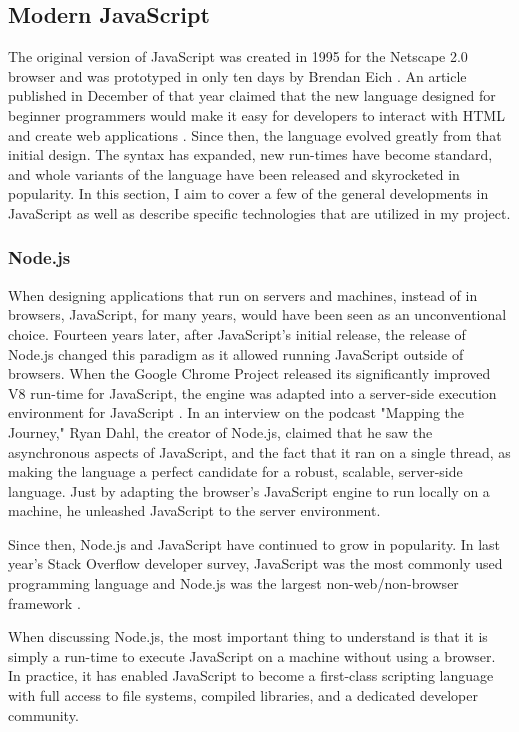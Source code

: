 \subsection{Modern JavaScript}

The original version of JavaScript was created in 1995 for the Netscape 2.0 browser and was prototyped in only ten days by Brendan Eich \cite{redhatinc.CreatingJavaScript}.  An article published in December of that year claimed that the new language designed for beginner programmers would make it easy for developers to interact with HTML and create web applications \cite{bucholtzNewLanguageAims1995}.  Since then, the language evolved greatly from that initial design.  The syntax has expanded, new run-times have become standard, and whole variants of the language have been released and skyrocketed in popularity.  In this section, I aim to cover a few of the general developments in JavaScript as well as describe specific technologies that are utilized in my project.

\subsubsection{Node.js}
When designing applications that run on servers and machines, instead of in browsers, JavaScript, for many years, would have been seen as an unconventional choice.  Fourteen years later, after JavaScript's initial release, the release of Node.js changed this paradigm as it allowed running JavaScript outside of browsers. When the Google Chrome Project released its significantly improved V8 run-time for JavaScript, the engine was adapted into a server-side execution environment for JavaScript \cite{pramodEpisodeInterviewRyan}.  In an interview on the podcast "Mapping the Journey," Ryan Dahl, the creator of Node.js, claimed that he saw the asynchronous aspects of JavaScript, and the fact that it ran on a single thread, as making the language a perfect candidate for a robust, scalable, server-side language.  Just by adapting the browser's JavaScript engine to run locally on a machine, he unleashed JavaScript to the server environment.

Since then, Node.js and JavaScript have continued to grow in popularity. In last year's Stack Overflow developer survey, JavaScript was the most commonly used programming language and Node.js was the largest non-web/non-browser framework \cite{stackoverflowStackOverflowDeveloper}.

When discussing Node.js, the most important thing to understand is that it is simply a run-time to execute JavaScript on a machine without using a browser.  In practice, it has enabled JavaScript to become a first-class scripting language with full access to file systems, compiled libraries, and a dedicated developer community.

